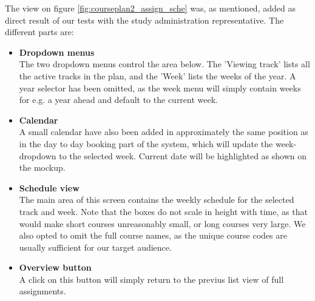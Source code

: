 The view on figure \ref{fig:courseplan2_assign_sche} was, as mentioned, added as direct result of our tests with the study administration representative. The different parts are:
\begin{itemize}
\item \textbf{Dropdown menus} \\
The two dropdown menus control the area below. The 'Viewing track' lists all the active tracks in the plan, and the 'Week' lists the weeks of the year. A year selector has been omitted, as the week menu will simply contain weeks for e.g. a year ahead and default to the current week.
\item \textbf{Calendar} \\
A small calendar have also been added in approximately the same position as in the day to day booking part of the system, which will update the week-dropdown to the selected week. Current date will be highlighted as shown on the mockup.
\item \textbf{Schedule view} \\
The main area of this screen contains the weekly schedule for the selected track and week. Note that the boxes do not scale in height with time, as that would make short courses unreasonably small, or long courses very large. We also opted to omit the full course names, as the unique course codes are usually sufficient for our target audience.
\item \textbf{Overview button} \\
A click on this button will simply return to the previus list view of full assignments.
\end{itemize}